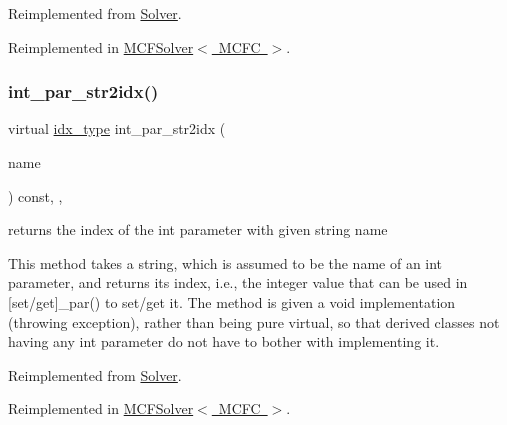 Reimplemented from \mbox{\hyperlink{class_s_m_spp__di__unipi__it_1_1_solver_a61e973f39747f63b8f56d97cc62e32ce}{Solver}}.



Reimplemented in \mbox{\hyperlink{class_s_m_spp__di__unipi__it_1_1_m_c_f_solver_a61e973f39747f63b8f56d97cc62e32ce}{M\+C\+F\+Solver$<$ M\+C\+F\+C $>$}}.

\mbox{\label{class_s_m_spp__di__unipi__it_1_1_c_d_a_solver_ae281b6699b0707a5cdc1e82b76d26c09}} 
\subsubsection{\texorpdfstring{int\+\_\+par\+\_\+str2idx()}{int\_par\_str2idx()}}
{\footnotesize\ttfamily virtual \mbox{\hyperlink{class_s_m_spp__di__unipi__it_1_1_thin_compute_interface_aa3d710629ad8c434286726ad810c3b47}{idx\+\_\+type}} int\+\_\+par\+\_\+str2idx (\begin{DoxyParamCaption}\item[{const std\+::string \&}]{name }\end{DoxyParamCaption}) const\hspace{0.3cm}{\ttfamily [inline]}, {\ttfamily [override]}, {\ttfamily [virtual]}}



returns the index of the int parameter with given string name 

This method takes a string, which is assumed to be the name of an int parameter, and returns its index, i.\+e., the integer value that can be used in \mbox{[}set/get\mbox{]}\+\_\+par() to set/get it. The method is given a void implementation (throwing exception), rather than being pure virtual, so that derived classes not having any int parameter do not have to bother with implementing it. 

Reimplemented from \mbox{\hyperlink{class_s_m_spp__di__unipi__it_1_1_solver_ae281b6699b0707a5cdc1e82b76d26c09}{Solver}}.



Reimplemented in \mbox{\hyperlink{class_s_m_spp__di__unipi__it_1_1_m_c_f_solver_ae281b6699b0707a5cdc1e82b76d26c09}{M\+C\+F\+Solver$<$ M\+C\+F\+C $>$}}.


